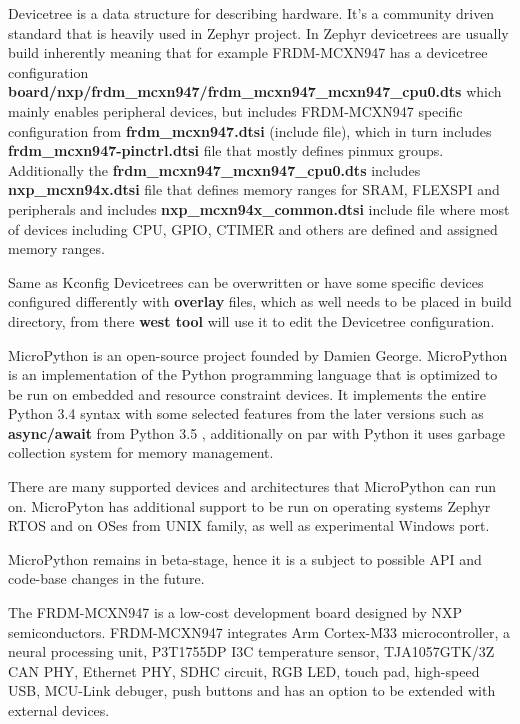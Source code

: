 \documentclass[twoside, 12pt]{article}
\begin{document}
Devicetree is a data structure for describing hardware. It's a community driven standard
that is heavily used in Zephyr project. In Zephyr devicetrees are usually build inherently 
meaning that for example FRDM-MCXN947 has a devicetree configuration \textbf{board/nxp/frdm\_mcxn947/frdm\_mcxn947\_mcxn947\_cpu0.dts}
which mainly enables peripheral devices, but includes FRDM-MCXN947 specific configuration 
from \textbf{frdm\_mcxn947.dtsi} (include file), which in turn includes 
\textbf{frdm\_mcxn947-pinctrl.dtsi} file that mostly defines pinmux groups. Additionally the 
\textbf{frdm\_mcxn947\_mcxn947\_cpu0.dts} includes \textbf{nxp\_mcxn94x.dtsi} file that 
defines memory ranges for SRAM, FLEXSPI and peripherals and includes 
\textbf{nxp\_mcxn94x\_common.dtsi} include file where most of devices including CPU, GPIO, 
CTIMER and others are defined and assigned memory ranges.\cite{devicetree_spec}

Same as Kconfig Devicetrees can be overwritten or have some specific devices configured 
differently with \textbf{overlay} files, which as well needs to be placed in build directory, 
from there \textbf{west tool} will use it to edit the Devicetree configuration.

MicroPython is an open-source project founded by Damien George. MicroPython is an implementation of the Python programming 
language that 
is optimized to be run on embedded and resource constraint devices. It implements 
the entire Python 3.4 syntax with some selected features from the later versions such as
\textbf{async/await} from Python 3.5 , additionally on par with Python it uses garbage 
collection system for memory management. 


There are many supported devices and architectures that MicroPython can run on.
MicroPyton has additional support to be run on
operating systems Zephyr RTOS and on OSes from UNIX family, as well as experimental Windows 
port.

MicroPython remains in beta-stage, hence it is a subject to possible API and code-base changes in the future.\cite{mpy_book}

The FRDM-MCXN947 is a low-cost development board designed by NXP semiconductors. FRDM-MCXN947 integrates Arm
Cortex-M33 microcontroller, a neural processing unit, P3T1755DP I3C temperature sensor, 
TJA1057GTK/3Z CAN PHY, Ethernet PHY, SDHC circuit, RGB LED, touch pad, high-speed USB, MCU-Link debuger,
push buttons and has an option to be extended with external devices.
\cite{mcxn947_manual}
\end{document}
